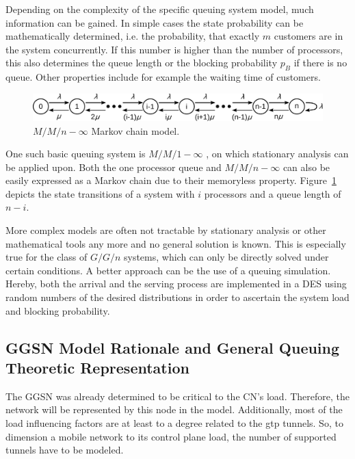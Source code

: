 Depending on the complexity of the specific queuing system model, much information can be gained. In simple cases the state probability can be mathematically determined, i.e. the probability, that exactly $m$ customers are in the system concurrently. If this number is higher than the number of processors, this also determines the queue length or the blocking probability $p_B$ if there is no queue. Other properties include for example the waiting time of customers.

\begin{figure}[htb]
	\centering
	\includegraphics[width=\textwidth]{images/markovchain.pdf}
	\caption{$M/M/n-\infty$ Markov chain model.}
\label{c4:fig:markovchain}
\end{figure}

One such basic queuing system is $M/M/1-\infty$ \cite[pp.~94-99]{Kleinrock:1975:TVQ:1096491}, on which stationary analysis can be applied upon. Both the one processor queue and $M/M/n-\infty$ can also be easily expressed as a Markov chain due to their memoryless property. Figure~\ref{c4:fig:markovchain} depicts the state transitions of a system with $i$ processors and a queue length of $n-i$.

More complex models are often not tractable by stationary analysis or other mathematical tools any more and no general solution is known. This is especially true for the class of $G/G/n$ systems, which can only be directly solved under certain conditions. A better approach can be the use of a queuing simulation. Hereby, both the arrival and the serving process are implemented in a \gls{DES} using random numbers of the desired distributions in order to ascertain the system load and blocking probability.


\subsection{GGSN Model Rationale and General Queuing Theoretic Representation}

The \gls{GGSN} was already determined to be critical to the \gls{CN}'s load. Therefore, the network will be represented by this node in the model. Additionally, most of the load influencing factors are at least to a degree related to the \gls{gtp} tunnels. So, to dimension a mobile network to its control plane load, the number of supported tunnels have to be modeled. 


